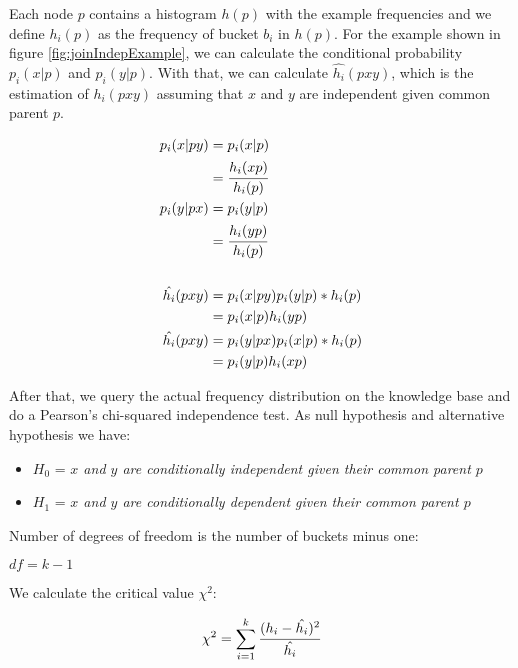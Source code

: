 Each node $p$ contains a histogram $h(p)$ with the example frequencies and we define $h_i(p)$ as the frequency of bucket
$b_i$ in $h(p)$. For the example shown in figure \ref{fig:joinIndepExample}, we can calculate the conditional
probability $p_i(x|p)$ and $p_i(y|p)$. With that, we can calculate $\hat{h_i}(p x y)$, which is the estimation of
$h_i(p x y)$ assuming that $x$ and $y$ are independent given common parent $p$.

\begin{equation}
\label{eq:condindep}
\begin{split}
 p_i(x|py) &= p_i(x|p) \\ 
 &= \cfrac{h_i(xp)}{h_i(p)} \\ 
 p_i(y|px) &= p_i(y|p) \\ 
 &= \cfrac{h_i(yp)}{h_i(p)} \\ \\ 
 \hat{h_i}(pxy) &= p_i(x|py)p_i(y|p)*h_i(p) \\ 
 &= p_i(x|p)h_i(yp) \\ 
 \hat{h_i}(pxy) &= p_i(y|px)p_i(x|p)*h_i(p) \\ 
 &= p_i(y|p)h_i(xp) 
\end{split}
\end{equation}

After that, we query the actual frequency distribution on the knowledge base and do a Pearson's chi-squared
independence test. As null hypothesis and alternative hypothesis we have:

\begin{itemize}
 \item $H_0$ = \emph{$x$ and $y$ are conditionally independent given their common parent $p$}
 \item $H_1$ = \emph{$x$ and $y$ are conditionally dependent given their common parent $p$} 
\end{itemize}

Number of degrees of freedom is the number of buckets minus one:

\begin{center}
 $df=k-1$
\end{center}

We calculate the critical value $\chi^2$:

\begin{equation}
 \chi^2=\sum_{i=1}^{k} \cfrac{(h_i - \hat{h_i})^2}{\hat{h_i}}
\end{equation}

\cite{Jaroszewicz02pruningredundant}

